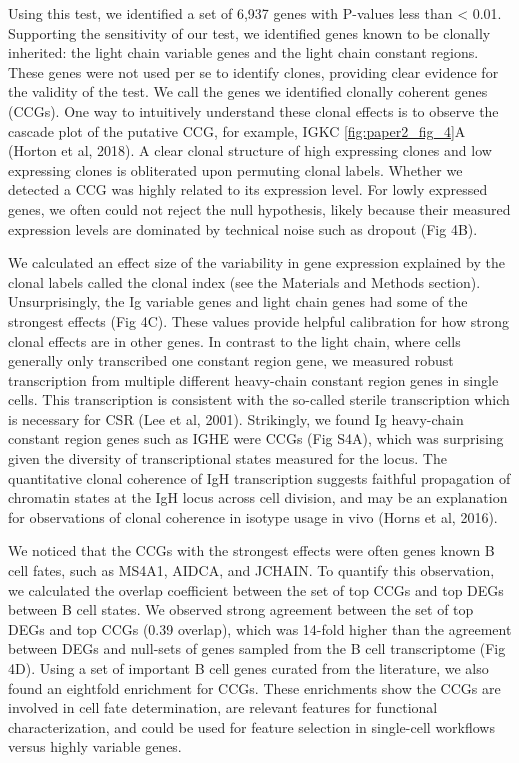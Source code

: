 Using this test, we identified a set of 6,937 genes with P-values less than < 0.01. Supporting the sensitivity of our test, we identified genes known to be clonally inherited: the light chain variable genes and the light chain constant regions. These genes were not used per se to identify clones, providing clear evidence for the validity of the test. We call the genes we identified clonally coherent genes (CCGs). One way to intuitively understand these clonal effects is to observe the cascade plot of the putative CCG, for example, IGKC \ref{fig:paper2_fig_4}A (Horton et al, 2018). A clear clonal structure of high expressing clones and low expressing clones is obliterated upon permuting clonal labels. Whether we detected a CCG was highly related to its expression level. For lowly expressed genes, we often could not reject the null hypothesis, likely because their measured expression levels are dominated by technical noise such as dropout (Fig 4B).

We calculated an effect size of the variability in gene expression explained by the clonal labels called the clonal index (see the Materials and Methods section). Unsurprisingly, the Ig variable genes and light chain genes had some of the strongest effects (Fig 4C). These values provide helpful calibration for how strong clonal effects are in other genes. In contrast to the light chain, where cells generally only transcribed one constant region gene, we measured robust transcription from multiple different heavy-chain constant region genes in single cells. This transcription is consistent with the so-called sterile transcription which is necessary for CSR (Lee et al, 2001). Strikingly, we found Ig heavy-chain constant region genes such as IGHE were CCGs (Fig S4A), which was surprising given the diversity of transcriptional states measured for the locus. The quantitative clonal coherence of IgH transcription suggests faithful propagation of chromatin states at the IgH locus across cell division, and may be an explanation for observations of clonal coherence in isotype usage in vivo (Horns et al, 2016).

We noticed that the CCGs with the strongest effects were often genes known B cell fates, such as MS4A1, AIDCA, and JCHAIN. To quantify this observation, we calculated the overlap coefficient between the set of top CCGs and top DEGs between B cell states. We observed strong agreement between the set of top DEGs and top CCGs (0.39 overlap), which was 14-fold higher than the agreement between DEGs and null-sets of genes sampled from the B cell transcriptome (Fig 4D). Using a set of important B cell genes curated from the literature\cite{morgan_unraveling_2022}, we also found an eightfold enrichment for CCGs. These enrichments show the CCGs are involved in cell fate determination, are relevant features for functional characterization, and could be used for feature selection in single-cell workflows versus highly variable genes.

